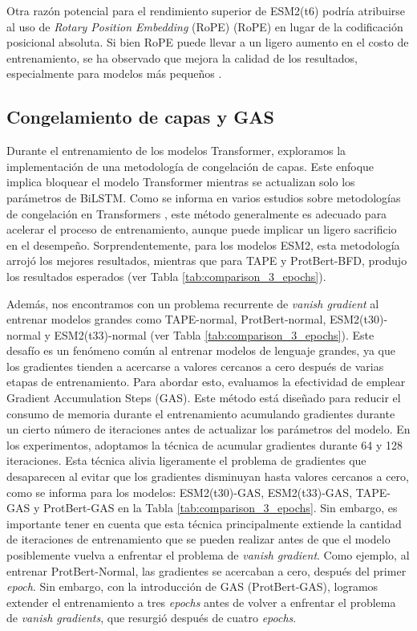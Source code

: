 Otra razón potencial para el rendimiento superior de ESM2(t6) podría atribuirse al uso de \textit{Rotary Position Embedding} (RoPE) (RoPE) en lugar de la codificación posicional absoluta. Si bien RoPE puede llevar a un ligero aumento en el costo de entrenamiento, se ha observado que mejora la calidad de los resultados, especialmente para modelos más pequeños \citep{lin2023evolutionary}.

\subsection{Congelamiento de capas y GAS}
Durante el entrenamiento de los modelos Transformer, exploramos la implementación de una metodología de congelación de capas. Este enfoque implica bloquear el modelo Transformer mientras se actualizan solo los parámetros de BiLSTM. Como se informa en varios estudios sobre metodologías de congelación en Transformers \citep{merchant2020happens,lee2019would,kovaleva2019revealing}, este método generalmente es adecuado para acelerar el proceso de entrenamiento, aunque puede implicar un ligero sacrificio en el desempeño. Sorprendentemente, para los modelos ESM2, esta metodología arrojó los mejores resultados, mientras que para TAPE y ProtBert-BFD, produjo los resultados esperados (ver Tabla \ref{tab:comparison_3_epochs}).


Además, nos encontramos con un problema recurrente de \textit{vanish gradient} al entrenar modelos grandes como TAPE-normal, ProtBert-normal, ESM2(t30)-normal y ESM2(t33)-normal (ver Tabla \ref{tab:comparison_3_epochs}). Este desafío es un fenómeno común al entrenar modelos de lenguaje grandes, ya que los gradientes tienden a acercarse a valores cercanos a cero después de varias etapas de entrenamiento. Para abordar esto, evaluamos la efectividad de emplear Gradient Accumulation Steps (GAS). Este método está diseñado para reducir el consumo de memoria durante el entrenamiento acumulando gradientes durante un cierto número de  iteraciones antes de actualizar los parámetros del modelo. En los experimentos, adoptamos la técnica de acumular gradientes durante 64 y 128 iteraciones. Esta técnica alivia ligeramente el problema de gradientes que desaparecen al evitar que los gradientes disminuyan hasta valores cercanos a cero, como se informa para los modelos: ESM2(t30)-GAS, ESM2(t33)-GAS, TAPE-GAS y ProtBert-GAS en la Tabla \ref{tab:comparison_3_epochs}. Sin embargo, es importante tener en cuenta que esta técnica principalmente extiende la cantidad de iteraciones de entrenamiento que se pueden realizar antes de que el modelo posiblemente vuelva a enfrentar el problema de \textit{vanish gradient}. Como ejemplo, al entrenar ProtBert-Normal, las gradientes se acercaban a cero, después del primer \textit{epoch}. Sin embargo, con la introducción de GAS (ProtBert-GAS), logramos extender el entrenamiento a tres \textit{epochs} antes de volver a enfrentar el problema de \textit{vanish gradients}, que resurgió después de cuatro \textit{epochs}.


